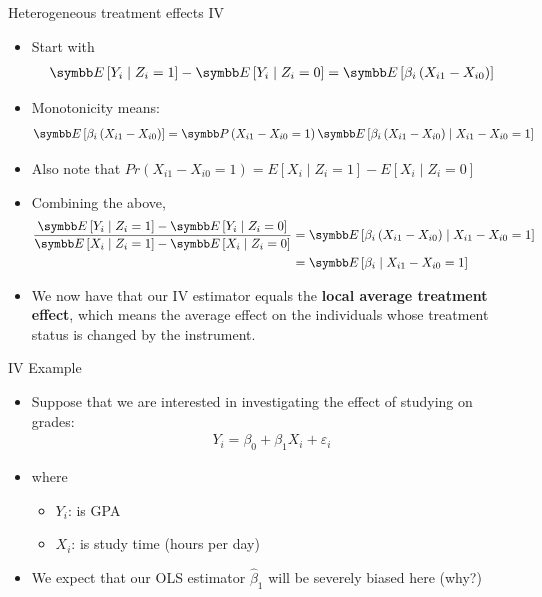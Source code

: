 \documentclass[aspectratio=169,11pt]{beamer}
\begin{document}
\begin{frame}{Heterogeneous treatment effects IV}
\begin{itemize}
\item Start with 
	\begin{align*}
	\E \left[ Y_i \mid Z_i = 1\right] - \E \left[ Y_i \mid Z_i = 0\right] = \E \left[ \beta_i \left(X_{i1} -X_{i0}\right) \right] 
	\end{align*}
	\item \alert{Monotonicity} means:
	\begin{align*}
		\E\left[\beta_{i}\left(X_{i1}-X_{i0}\right)\right]  = \Pr\left(X_{i1}-X_{i0}=1\right) \E\left[\beta_{i}\left(X_{i1}-X_{i0}\right)\mid X_{i1}-X_{i0}=1\right]
	\end{align*}

	\item Also note that $Pr\left(X_{i1}-X_{i0}=1\right) = E\left[ X_{i} \mid Z_i=1\right] - E\left[ X_{i} \mid Z_i=0\right]$

	\item Combining the above,
	\begin{align*}
	\frac{\E\left[ Y_i \mid Z_i = 1\right] - \E\left[ Y_i \mid Z_i = 0\right] }{\E\left[ X_{i} \mid Z_i=1\right] - \E\left[ X_{i} \mid Z_i=0\right]} 
	&= \E\left[\beta_{i}\left(X_{i1}-X_{i0}\right) \mid X_{i1}-X_{i0}=1\right]\\
	&= \E\left[\beta_{i} \mid X_{i1}-X_{i0}=1\right]
	\end{align*}

	\item We now have that our IV estimator equals the {\bf local average treatment effect}, which means the average effect on the individuals whose treatment
	status is changed by the instrument. 

\end{itemize}
\end{frame}





\begin{frame}{IV Example}
\begin{itemize}

\item Suppose that we are interested in investigating the effect of studying on grades:
\begin{align*}
Y_i=\beta_0 + \beta_1 X_i + \varepsilon_i
\end{align*}
\item where
\begin{itemize}
\item $Y_i$: is GPA
\item $X_i$: is study time (hours per day)
\end{itemize}
\medskip
\item We expect that our OLS estimator $\hat{\beta}_1$ will be severely biased here (why?)
\end{itemize}
\end{frame}
\end{document}
